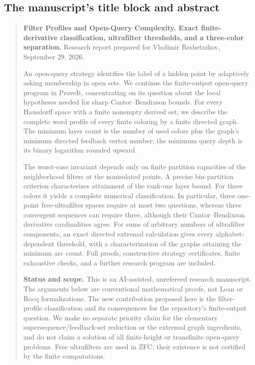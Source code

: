 \documentclass[11pt,letterpaper]{article}
\numberwithin{equation}{section}
\theoremstyle{definition}
\theoremstyle{remark}
\theoremstyle{definition}
\begin{document}
\subsection{The manuscript's title block and abstract}
\label{fp:sec:abstract}
\begin{quote}\small
\textbf{Filter Profiles and Open-Query Complexity. Exact finite-derivative
classification, ultrafilter thresholds, and a three-color separation.}
Research report prepared for Vladimir Reshetnikov, September 29, 2026.

An open-query strategy identifies the label of a hidden point by adaptively
asking membership in open sets. We continue the finite-output open-query
program in ProveIt, concentrating on its question about the local hypotheses
needed for sharp Cantor--Bendixson bounds. For every Hausdorff space with a
finite nonempty derived set, we describe the complete word profile of every
finite coloring by a finite directed graph. The minimum layer count is the
number of used colors plus the graph's minimum directed feedback vertex
number; the minimum query depth is its binary logarithm rounded upward.

The worst-case invariant depends only on finite partition capacities of the
neighborhood filters at the nonisolated points. A precise bin-partition
criterion characterizes attainment of the rank-one layer bound. For three
colors it yields a complete numerical classification. In particular, three
one-point free-ultrafilter spaces require at most two questions, whereas
three convergent sequences can require three, although their
Cantor--Bendixson derivative cardinalities agree. For sums of arbitrary numbers
of ultrafilter components, an exact directed extremal calculation gives every
alphabet-dependent threshold, with a characterization of the graphs attaining
the minimum arc count. Full proofs, constructive strategy certificates,
finite exhaustive checks, and a further research program are included.

\textbf{Status and scope.}
This is an AI-assisted, unrefereed research manuscript. The arguments below
are conventional mathematical proofs, not Lean or Rocq formalizations.
The new contribution proposed here is the filter-profile classification and
its consequences for the repository's finite-output question. We make no
separate priority claim for the elementary supersequence/feedback-set
reduction or the extremal graph ingredients, and do not claim a solution of
all finite-height or transfinite open-query problems. Free ultrafilters are
used in ZFC; their existence is not certified by the finite computations.
\end{quote}
\end{document}
